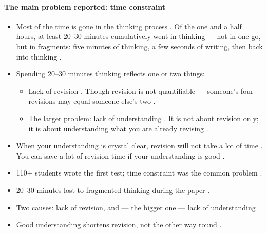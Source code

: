 \paragraph{The main problem reported: time constraint}
\begin{itemize}
    \item Most of the time is gone in the thinking process . Of the one and a half hours, at least 20--30 minutes cumulatively went in thinking --- not in one go, but in fragments: five minutes of thinking, a few seconds of writing, then back into thinking .
    \item Spending 20--30 minutes thinking reflects one or two things:
    \begin{itemize}
        \item Lack of revision . Though revision is not quantifiable --- someone's four revisions may equal someone else's two .
        \item The larger problem: lack of understanding . It is not about revision only; it is about understanding what you are already revising .
    \end{itemize}
    \item When your understanding is crystal clear, revision will not take a lot of time . You can save a lot of revision time if your understanding is good .
\end{itemize}

\begin{QuickRevision}
\begin{itemize}
    \item 110+ students wrote the first test; time constraint was the common problem .
    \item 20--30 minutes lost to fragmented thinking during the paper .
    \item Two causes: lack of revision, and --- the bigger one --- lack of understanding .
    \item Good understanding shortens revision, not the other way round .
\end{itemize}
\end{QuickRevision}

